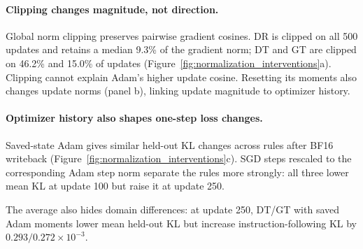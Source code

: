 \paragraph{Clipping changes magnitude, not direction.}
Global norm clipping preserves pairwise gradient cosines. DR is clipped on all 500 updates and retains a median 9.3\% of the gradient norm; DT and GT are clipped on 46.2\% and 15.0\% of updates (Figure~\ref{fig:normalization_interventions}a). Clipping cannot explain Adam's higher update cosine. Resetting its moments also changes update norms (panel b), linking update magnitude to optimizer history.

\paragraph{Optimizer history also shapes one-step loss changes.}
Saved-state Adam gives similar held-out KL changes across rules after BF16 writeback (Figure~\ref{fig:normalization_interventions}c). SGD steps rescaled to the corresponding Adam step norm separate the rules more strongly: all three lower mean KL at update 100 but raise it at update 250.

The average also hides domain differences: at update 250, DT/GT with saved Adam moments lower mean held-out KL but increase instruction-following KL by $0.293/0.272\times10^{-3}$.



\FloatBarrier
